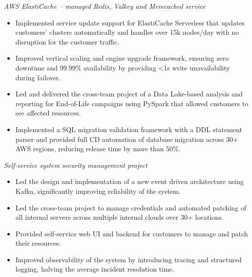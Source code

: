\documentclass[10pt,a4paper,ragged2e,withhyper]{altacv}
\begin{document}
\begin{paracol}{2}


\textit{AWS ElastiCache – managed Redis, Valkey and Memcached service}

\begin{itemize}
  \item Implemented service update support for ElastiCache Serverless that updates customers' clusters automatically and handles over 15k nodes/day with no disruption for the customer traffic.
  \item Improved vertical scaling and engine upgrade framework, ensuring zero downtime and 99.99\% availability by providing <1s write unavailability during failover.
  \item Led and delivered the cross-team project of a Data Lake-based analysis and reporting for End-of-Life campaigns using PySpark that allowed customers to see affected resources.
  \item Implemented a SQL migration validation framework with a DDL statement parser and provided full CD automation of database migration across 30+ AWS regions, reducing release time by more than 50\%.
\end{itemize}

\divider


\textit{Self-service system security management project}

\begin{itemize}
  \item Led the design and implementation of a new event driven architecture using Kafka, significantly improving reliability of the system.
  \item Led the cross-team project to manage credentials and automated patching of all internal servers across multiple internal clouds over 30+ locations.
  \item Provided self-service web UI and backend for customers to manage and patch their resources.
  \item Improved observability of the system by introducing tracing and structured logging, halving the average incident resolution time.
\end{itemize}


\end{paracol}
\end{document}
